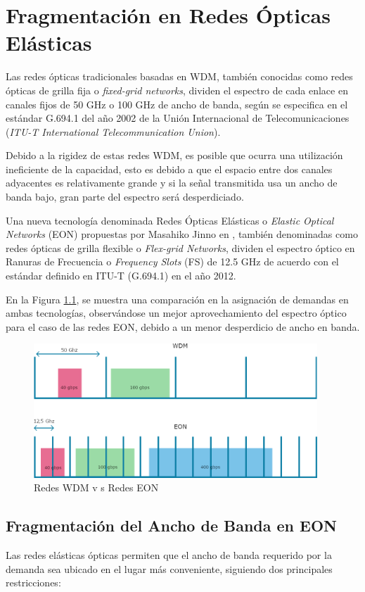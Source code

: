 \chapter{Fragmentación en Redes Ópticas Elásticas}
Las redes ópticas tradicionales basadas en WDM, también conocidas como redes ópticas de grilla fija o \textit{fixed-grid networks}, dividen el espectro de cada enlace en canales fijos de 50 GHz o 100 GHz de ancho de banda,  según se especifica en el estándar G.694.1 del año 2002 de la
Unión Internacional de Telecomunicaciones (\textit{ITU-T International Telecommunication Union}).

Debido a la rigidez de estas redes WDM, es posible que ocurra una utilización ineficiente de la capacidad, esto es debido a que el espacio entre dos canales adyacentes es relativamente grande y si la señal transmitida usa un ancho de banda bajo, gran parte del espectro será desperdiciado.

Una nueva tecnología denominada Redes Ópticas Elásticas o \textit{Elastic Optical Networks} (EON) propuestas por Masahiko Jinno en \cite{jinno2009spectrum}, también denominadas como redes ópticas de grilla flexible o \textit{Flex-grid Networks}, dividen el espectro óptico en Ranuras de Frecuencia o \textit{Frequency Slots} (FS) de 12.5 GHz de acuerdo con el estándar definido en ITU-T (G.694.1) en el año 2012.

En la Figura \ref{fig:eonwdm}, se muestra una comparación en la asignación de demandas en ambas tecnologías, observándose un mejor aprovechamiento del espectro óptico para el caso de las redes EON, debido a un menor desperdicio de ancho en banda.

\begin{figure}
    \centering
    \includegraphics[width=0.95\textwidth]{capitulos/img/eonwdm.png}
    \caption{Redes WDM v s Redes EON}
    \label{fig:eonwdm}
\end{figure}


\section{Fragmentación del Ancho de Banda en EON}
Las redes elásticas ópticas permiten que el ancho de banda requerido por la demanda sea ubicado en el lugar más conveniente, siguiendo dos principales restricciones:

